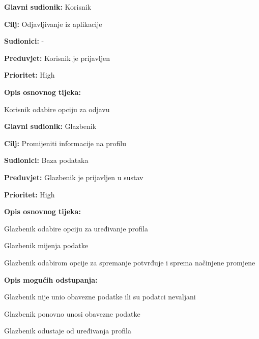\noindent {}
	\begin{packed_item}
	   	
	   	\item \textbf{Glavni sudionik: } Korisnik
	   	\item \textbf{Cilj:} Odjavljivanje iz aplikacije
	   	\item \textbf{Sudionici:} -
	   	\item \textbf{Preduvjet:} Korisnik je prijavljen
	   	\item \textbf{Prioritet:} High
	   	\item \textbf{Opis osnovnog tijeka:} 
	   	
	   	\item[] \begin{packed_enum}
	   		
	   		\item Korisnik odabire opciju za odjavu
	   		
	   	\end{packed_enum}
	\end{packed_item}	 

\noindent {}
	\begin{packed_item}
		
		\item \textbf{Glavni sudionik:} Glazbenik
		\item \textbf{Cilj:} Promijeniti informacije na profilu
		\item \textbf{Sudionici:} Baza podataka
		\item \textbf{Preduvjet:} Glazbenik je prijavljen u sustav
		\item \textbf{Prioritet:} High
		\item \textbf{Opis osnovnog tijeka:}
		
		\item[] \begin{packed_enum}
			\item Glazbenik odabire opciju za uređivanje profila 
			\item Glazbenik mijenja podatke
			\item Glazbenik odabirom opcije za spremanje potvrđuje i sprema načinjene promjene
		\end{packed_enum}
	
		\item  \textbf{Opis mogućih odstupanja:}
		\item[] \begin{packed_item}
			
			\item[3.a] Glazbenik nije unio obavezne podatke ili su podatci nevaljani
			\item[] \begin{packed_enum}
				
				\item Glazbenik ponovno unosi obavezne podatke
				\item Glazbenik odustaje od uređivanja profila
				
			\end{packed_enum}	
		\end{packed_item}
	\end{packed_item}
	
